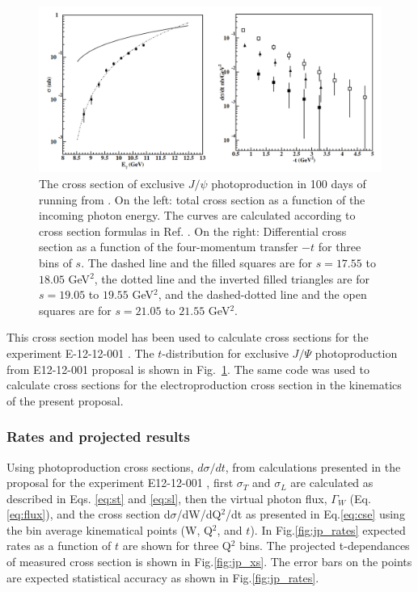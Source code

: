 \begin{figure}[htbp]
\begin{center}
\includegraphics[width=1\textwidth]{jpsi_photo.pdf}
\end{center}
\caption{The cross section of exclusive $J/\psi$ photoproduction in 100 days of running from \cite{tcs_clas12}. On the left: total cross section as a function of the incoming photon energy. The curves are calculated according to cross section formulas in Ref. \cite{brodsky:2000zc}. On the right: Differential cross section as a function of the four-momentum transfer $-t$ for three bins of $s$. The dashed line and the filled squares are for $s=17.55$ to $18.05$ GeV$^2$, the dotted line and the inverted filled triangles are for $s=19.05$ to $19.55$ GeV$^2$, and the dashed-dotted line and the open squares are for $s=21.05$ to $21.55$ GeV$^2$.}
\label{fig:jpsixs2}
\end{figure}


This cross section model has been used to calculate cross sections for the experiment E-12-12-001 \cite{e1212001}. The $t$-distribution for exclusive $J/\Psi$ photoproduction from E12-12-001 proposal is shown in Fig.~\ref{fig:jpsixs2}. The same code was used to calculate cross sections for the electroproduction cross section in the kinematics of the present proposal.





\subsubsection{Rates and projected results}
\indent

 Using photoproduction cross sections, $d\sigma/dt$,  from calculations presented in the proposal for the experiment E12-12-001 \cite{e1212001}, first $\sigma_T$ and $\sigma_L$ are calculated as described in Eqs. \ref{eq:st} and \ref{eq:sl}, then the virtual photon flux, $\Gamma_W$ (Eq.\ref{eq:flux}), and the cross section d$\sigma$/dW/dQ$^2$/dt as presented in Eq.\ref{eq:cse} using the bin average kinematical points (W, Q$^2$, and $t$). In Fig.\ref{fig:jp_rates} expected rates as a function of $t$ are shown for three Q$^2$ bins. The projected t-dependances of measured cross section is shown in Fig.\ref{fig:jp_xs}. The error bars on the points are expected statistical accuracy as shown in Fig.\ref{fig:jp_rates}.  
 
